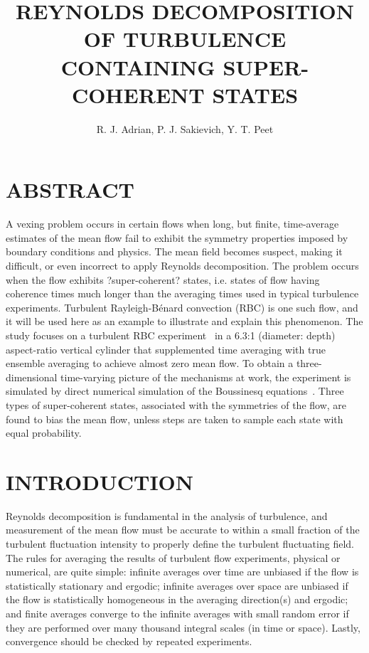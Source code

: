 \documentclass[twocolumn,10pt]{tsfp}
\title{REYNOLDS DECOMPOSITION OF TURBULENCE CONTAINING SUPER-COHERENT STATES}
\author{R. J. Adrian, P. J. Sakievich, Y. T. Peet
    \affiliation{
	Mechanical and Aerospace Engineering\\
	School of Matter Transport and Energy, \\
	 Arizona State University\\
	501 E. Tyler Mall, Tempe, AZ 85287\\
    email: rjadrian@asu.edu
    }	
}
\begin{document}
\maketitle   %

\fontsize{9}{11}\selectfont

\section*{ABSTRACT}
A vexing problem occurs in certain flows when long, but finite, time-average estimates of the mean flow fail to exhibit the symmetry properties imposed by boundary conditions and physics. The mean field becomes suspect, making it difficult, or even incorrect to apply Reynolds decomposition. The problem occurs when the flow exhibits ?super-coherent? states, i.e. states of flow having coherence times much longer than the averaging times used in typical turbulence experiments. Turbulent Rayleigh-B\'{e}nard convection (RBC) is one such flow, and it will be used here as an example to illustrate and explain this phenomenon. The study focuses on a turbulent RBC experiment~\citep{fernandes2001spatial} in a 6.3:1 (diameter: depth) aspect-ratio vertical cylinder that supplemented time averaging with true ensemble averaging to achieve almost zero mean flow. To obtain a three-dimensional time-varying picture of the mechanisms at work, the experiment is simulated by direct numerical simulation of the Boussinesq equations~\citep{sakievich2016large}. Three types of super-coherent states, associated with the symmetries of the flow, are found to bias the mean flow, unless steps are taken to sample each state with equal probability.  
\section*{INTRODUCTION}
Reynolds decomposition is fundamental in the analysis of turbulence, and measurement of the mean flow must be accurate to within a small fraction of the turbulent fluctuation intensity to properly define the turbulent fluctuating field. The rules for averaging the results of turbulent flow experiments, physical or numerical, are quite simple: infinite averages over time are unbiased if the flow is statistically stationary and ergodic; infinite averages over space are unbiased if the flow is statistically homogeneous in the averaging direction(s) and ergodic; and finite averages converge to the infinite averages with small random error if they are performed over many thousand integral scales (in time or space). Lastly, convergence should be checked by repeated experiments.
\end{document}
